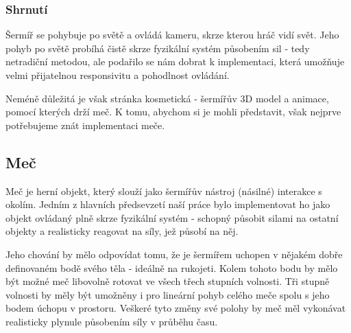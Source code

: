 \subsubsection*{Shrnutí}

Šermíř se pohybuje po světě a ovládá kameru, skrze kterou hráč vidí svět. Jeho pohyb po světě probíhá čistě skrze fyzikální systém působením sil - tedy netradiční metodou, ale podařilo se nám dobrat k implementaci, která umožňuje velmi přijatelnou responsivitu a pohodlnost ovládání. 

Neméně důležitá je však stránka kosmetická - šermířův 3D model a animace, pomocí kterých drží meč. K tomu, abychom si je mohli představit, však nejprve potřebujeme znát implementaci meče. 






\subsection{Meč}

Meč je herní objekt, který slouží jako šermířův nástroj (násilné) interakce s okolím. Jedním z hlavních předsevzetí naší práce bylo implementovat ho jako objekt ovládaný plně skrze fyzikální systém - schopný působit silami na ostatní objekty a realisticky reagovat na síly, jež působí na něj.

Jeho chování by mělo odpovídat tomu, že je šermířem uchopen v nějakém dobře definovaném bodě svého těla - ideálně na rukojeti. Kolem tohoto bodu by mělo být možné meč libovolně rotovat ve všech třech stupních volnosti. Tři stupně volnosti by měly být umožněny i pro lineární pohyb celého meče spolu s jeho bodem úchopu v prostoru. Veškeré tyto změny své polohy by meč měl vykonávat realisticky plynule působením síly v průběhu času.

